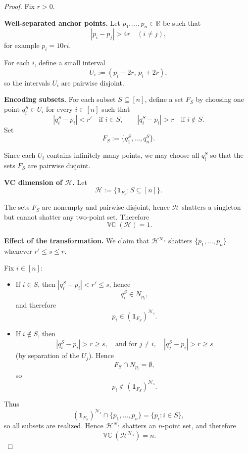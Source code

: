 \documentclass[11pt]{article}
\theoremstyle{plain}
\newtheorem{lemma}[theorem]{Lemma}
\theoremstyle{definition}
\theoremstyle{remark}
\DeclareMathOperator{\VCdim}{\mathbb{VC}}
\newcommand{\R}{\mathbb{R}}
\begin{document}
\begin{proof}
Fix \(r>0\).

\textbf{Well-separated anchor points.}
Let \(p_1,\dots,p_n\in\R\) be such that
\[
|p_i-p_j|>4r \quad (i\neq j),
\]
for example \(p_i=10ri\).

For each \(i\), define a small interval
\[
U_i := (p_i-2r,\,p_i+2r),
\]
so the intervals \(U_i\) are pairwise disjoint.

\medskip
\textbf{Encoding subsets.}
For each subset \(S\subseteq[n]\), define a set \(F_S\) by choosing one point
\(q_i^S\in U_i\) for every \(i\in[n]\) such that
\[
|q_i^S-p_i|<r' \quad\text{if } i\in S,
\qquad
|q_i^S-p_i|>r \quad\text{if } i\notin S.
\]
Set
\[
F_S := \{q_1^S,\dots,q_n^S\}.
\]

Since each \(U_i\) contains infinitely many points, we may choose all
\(q_i^S\) so that the sets \(F_S\) are pairwise disjoint.

\medskip
\textbf{VC dimension of \(\mathcal H\).}
Let
\[
\mathcal H:=\{\mathbf 1_{F_S}:S\subseteq[n]\}.
\]

The sets \(F_S\) are nonempty and pairwise disjoint, hence \(\mathcal H\)
shatters a singleton but cannot shatter any two-point set. Therefore
\[
\VCdim(\mathcal H)=1.
\]

\medskip
\textbf{Effect of the transformation.}
We claim that \(\mathcal H^{\mathcal N_s}\) shatters
\(\{p_1,\dots,p_n\}\) whenever \(r' \le s \le r\).

Fix \(i\in[n]\):
\begin{itemize}
\item If \(i\in S\), then \(|q_i^S-p_i|<r' \le s\), hence
\[
q_i^S\in N_{p_i},
\]
and therefore
\[
p_i\in (\mathbf 1_{F_S})^{\mathcal N_s}.
\]

\item If \(i\notin S\), then
\[
|q_i^S-p_i|>r \ge s,
\quad\text{and for } j\neq i,\quad
|q_j^S-p_i|>r \ge s
\]
(by separation of the \(U_j\)). Hence
\[
F_S\cap N_{p_i}=\emptyset,
\]
so
\[
p_i\notin (\mathbf 1_{F_S})^{\mathcal N_s}.
\]
\end{itemize}

Thus
\[
(\mathbf 1_{F_S})^{\mathcal N_s}\cap\{p_1,\dots,p_n\}
=
\{p_i:i\in S\},
\]
so all subsets are realized. Hence \(\mathcal H^{\mathcal N_s}\)
shatters an \(n\)-point set, and therefore
\[
\VCdim(\mathcal H^{\mathcal N_s})=n.
\]
\end{proof}

\end{document}
